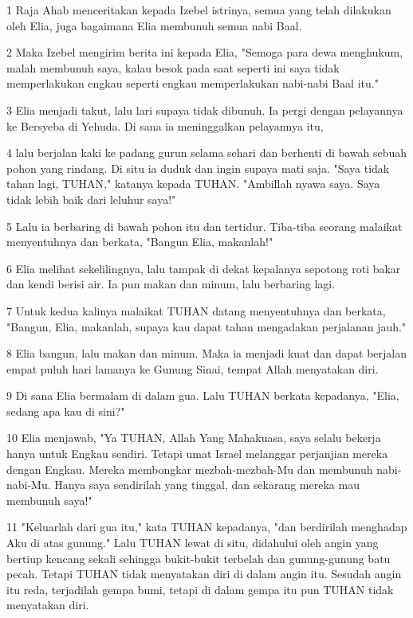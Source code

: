 \par 1 Raja Ahab menceritakan kepada Izebel istrinya, semua yang telah dilakukan oleh Elia, juga bagaimana Elia membunuh semua nabi Baal.
\par 2 Maka Izebel mengirim berita ini kepada Elia, "Semoga para dewa menghukum, malah membunuh saya, kalau besok pada saat seperti ini saya tidak memperlakukan engkau seperti engkau memperlakukan nabi-nabi Baal itu."
\par 3 Elia menjadi takut, lalu lari supaya tidak dibunuh. Ia pergi dengan pelayannya ke Bersyeba di Yehuda. Di sana ia meninggalkan pelayannya itu,
\par 4 lalu berjalan kaki ke padang gurun selama sehari dan berhenti di bawah sebuah pohon yang rindang. Di situ ia duduk dan ingin supaya mati saja. "Saya tidak tahan lagi, TUHAN," katanya kepada TUHAN. "Ambillah nyawa saya. Saya tidak lebih baik dari leluhur saya!"
\par 5 Lalu ia berbaring di bawah pohon itu dan tertidur. Tiba-tiba seorang malaikat menyentuhnya dan berkata, "Bangun Elia, makanlah!"
\par 6 Elia melihat sekelilingnya, lalu tampak di dekat kepalanya sepotong roti bakar dan kendi berisi air. Ia pun makan dan minum, lalu berbaring lagi.
\par 7 Untuk kedua kalinya malaikat TUHAN datang menyentuhnya dan berkata, "Bangun, Elia, makanlah, supaya kau dapat tahan mengadakan perjalanan jauh."
\par 8 Elia bangun, lalu makan dan minum. Maka ia menjadi kuat dan dapat berjalan empat puluh hari lamanya ke Gunung Sinai, tempat Allah menyatakan diri.
\par 9 Di sana Elia bermalam di dalam gua. Lalu TUHAN berkata kepadanya, "Elia, sedang apa kau di sini?"
\par 10 Elia menjawab, "Ya TUHAN, Allah Yang Mahakuasa, saya selalu bekerja hanya untuk Engkau sendiri. Tetapi umat Israel melanggar perjanjian mereka dengan Engkau. Mereka membongkar mezbah-mezbah-Mu dan membunuh nabi-nabi-Mu. Hanya saya sendirilah yang tinggal, dan sekarang mereka mau membunuh saya!"
\par 11 "Keluarlah dari gua itu," kata TUHAN kepadanya, "dan berdirilah menghadap Aku di atas gunung." Lalu TUHAN lewat di situ, didahului oleh angin yang bertiup kencang sekali sehingga bukit-bukit terbelah dan gunung-gunung batu pecah. Tetapi TUHAN tidak menyatakan diri di dalam angin itu. Sesudah angin itu reda, terjadilah gempa bumi, tetapi di dalam gempa itu pun TUHAN tidak menyatakan diri.
